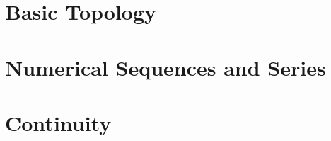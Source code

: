 \documentclass[
]{book}
\theoremstyle{definition}
\theoremstyle{definition}
\theoremstyle{definition}
\theoremstyle{definition}
\theoremstyle{remark}
\begin{document}
\chapter{Basic Topology}\label{basic-topology}

\chapter{Numerical Sequences and Series}\label{numerical-sequences-and-series}

\chapter{Continuity}\label{continuity}

  
\end{document}
